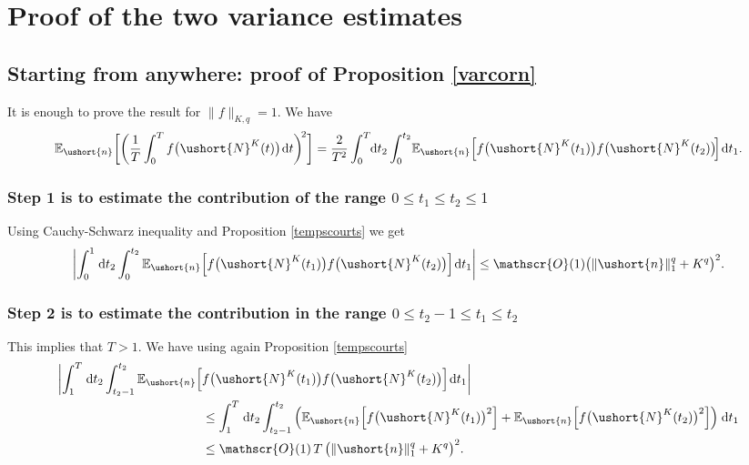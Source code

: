 \documentclass[JEP,XML,SOM,Unicode]{cedram}
\newcommand{\scaleto}[2]{#1}
\let\mathcal\mathscr
\numberwithin{equation}{section}
\theoremstyle{plain}
\theoremstyle{definition}
\newcommand{\E}{{\mathbb{E}}}
\newcommand{\Oun}{\mathcal{O}(1)}
\newcommand{\sK}{K}
\newcommand{\vecn}{\ushort{n}}
\newcommand{\leproc}{\ushort{N}^{K}}
\newcommand{\dd}{\hspace{1pt}\mathrm{d}}
\newcommand{\norm}[1]{\|#1\|_{1}}\let\snorm\norm
\begin{document}
\appendix

\section{Proof of the two variance estimates}\label{proof-variances}

\subsection{Starting from anywhere: proof of Proposition \ref{varcorn}}

It is enough to prove the result for $\|f\|_{\sK,q}=1$.
We have
\[
\E_{\vecn}\biggl[\biggl(\frac{1}{T}
\int_{0}^{T}f\bigl(\leproc(t)\bigr)\dd t\biggr)^{\!2}\biggr]
=\frac{\scaleto{2}{6pt}}{T^2}\int_{0}^{T}\!\!\dd t_{2}\int_{0}^{t_{2}}\!\E_{\vecn}\Bigl[
f\bigl(\leproc(t_{1})\bigr) f\bigl(\leproc(t_{2})\bigr)\!\Bigr]\dd t_{1}.
\]
\subsubsection*{Step 1 is to estimate the contribution of the range $0\le t_{1}\le t_{2}\le 1$} Using Cauchy-Schwarz inequality and Proposition \ref{tempscourts} we get
\[
\left|\int_{0}^{1}\dd t_{2}\int_{0}^{t_{2}}\E_{\vecn}\Bigl[
f\bigl(\leproc(t_{1})\bigr) f\bigl(\leproc(t_{2})\bigr)\Bigr]\dd t_{1}\right|
\le \Oun \bigl(\norm{\vecn}^{q}+K^{q}\bigr)^2.
\]
\subsubsection*{Step 2 is to estimate the contribution in the range $0\le
t_{2}-1\leq t_{1}\leq t_{2}$} This implies that $T>1$.
We have using again Proposition \ref{tempscourts}
\begin{align*}
\biggl|\int_{1}^{T} \dd t_{2}\int_{t_{2}-1}^{t_{2}}\E_{\vecn}
\Bigl[&f\bigl(\leproc(t_{1})\bigr) f\bigl(\leproc(t_{2})\bigr)\Bigr]\dd t_{1}\biggr|\\
& \le \int_{1}^{T} \dd t_{2}\int_{t_{2}-1}^{t_{2}}\left(\E_{\vecn}\Bigl[
f\bigl(\leproc(t_{1})\bigr)^2\Bigr]+ \E_{\vecn}\Bigl[f\bigl(\leproc(t_{2})\bigr)^2\Bigr]\right)\dd t_{1}\\
& \le \Oun \,T\,\bigl(\norm{\vecn}^{q}+K^{q}\bigr)^2.
\end{align*}
\end{document}
